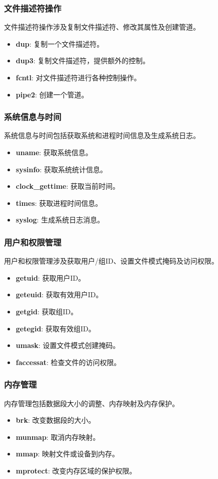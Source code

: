 \subsubsection{文件描述符操作}
文件描述符操作涉及复制文件描述符、修改其属性及创建管道。
\begin{itemize}
    \item \textbf{dup}: 复制一个文件描述符。
    \item \textbf{dup3}: 复制文件描述符，提供额外的控制。
    \item \textbf{fcntl}: 对文件描述符进行各种控制操作。
    \item \textbf{pipe2}: 创建一个管道。
\end{itemize}
\subsubsection{系统信息与时间}
系统信息与时间包括获取系统和进程时间信息及生成系统日志。
\begin{itemize}
    \item \textbf{uname}: 获取系统信息。
    \item \textbf{sysinfo}: 获取系统统计信息。
    \item \textbf{clock\_gettime}: 获取当前时间。
    \item \textbf{times}: 获取进程时间信息。
    \item \textbf{syslog}: 生成系统日志消息。
\end{itemize}
\subsubsection{用户和权限管理}
用户和权限管理涉及获取用户/组ID、设置文件模式掩码及访问权限。
\begin{itemize}
    \item \textbf{getuid}: 获取用户ID。
    \item \textbf{geteuid}: 获取有效用户ID。
    \item \textbf{getgid}: 获取组ID。
    \item \textbf{getegid}: 获取有效组ID。
    \item \textbf{umask}: 设置文件模式创建掩码。
    \item \textbf{faccessat}: 检查文件的访问权限。
\end{itemize}
\subsubsection{内存管理}
内存管理包括数据段大小的调整、内存映射及内存保护。
\begin{itemize}
    \item \textbf{brk}: 改变数据段的大小。
    \item \textbf{munmap}: 取消内存映射。
    \item \textbf{mmap}: 映射文件或设备到内存。
    \item \textbf{mprotect}: 改变内存区域的保护权限。
\end{itemize}
